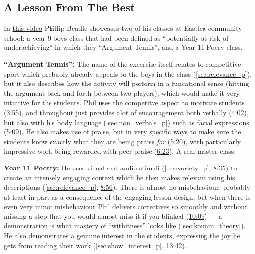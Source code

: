 \documentclass[12pt]{report}
\begin{document}
\begin{appendices}
\section{A Lesson From The Best}
\label{video:4}

In \href{https://www.youtube.com/watch?v=zr2xdjQPH4I}{this video} Phillip Beadle showcases two of his classes at Eastlea community school: a year 9 boys class that had been defined as ``potentially at risk of underachieving'' in which they ``Argument Tennis'', and a Year 11 Poery class.

\textbf{``Argument Tennis'':}  The name of the excercise itself relates to competitive sport which probably already appeals to the boys in the class (\ref{sec:relevance_p}), but it also describes how the activity will perform in a funcational sense (hitting the argument back and forth between two players), which would make it very intuitive for the students. Phil uses the competitve aspect to motivate students (\href{https://www.youtube.com/watch?v=zr2xdjQPH4I&t=235}{3:55}), and throughout just provides alot of encouragement both verbally (\href{https://www.youtube.com/watch?v=zr2xdjQPH4I&t=242}{4:02}), but also with his body language (\ref{sec:non_verbals_p}) such as facial expressions (\href{https://www.youtube.com/watch?v=zr2xdjQPH4I&t=309}{5:09}). He also makes use of praise, but in very specific ways to make sure the students know exactly what they are being praise \emph{for} (\href{https://www.youtube.com/watch?v=zr2xdjQPH4I&t=320}{5:20}), with particularly impressive work being rewarded with peer praise (\href{https://www.youtube.com/watch?v=zr2xdjQPH4I&t=383}{6:23}). A real master class.

\textbf{Year 11 Poetry:} He uses visual and audio stimuli (\ref{sec:variety_p}, \href{https://www.youtube.com/watch?v=zr2xdjQPH4I&t=515}{8:35}) to create an intensely engaging context which he then makes relevant using his descriptions (\ref{sec:relevance_p}, \href{https://www.youtube.com/watch?v=zr2xdjQPH4I&t=536}{8:56}). There is almost no misbehaviour, probably at least in part as a consequence of the engaging lesson design, but when there is even very minor misbehaviour Phil delivers correctives so smoothly and without missing a step that you would almost miss it if you blinked (\href{https://www.youtube.com/watch?v=zr2xdjQPH4I&t=609}{10:09}) --- a demonstration is what mastery of ``withitness'' looks like (\ref{sec:kounin_theory}). He also demonstrates a genuine interest in the students, expressing the joy he gets from reading their work (\ref{sec:show_interest_p}, \href{https://www.youtube.com/watch?v=zr2xdjQPH4I&t=822}{13:42}).










\end{appendices}
\end{document}
